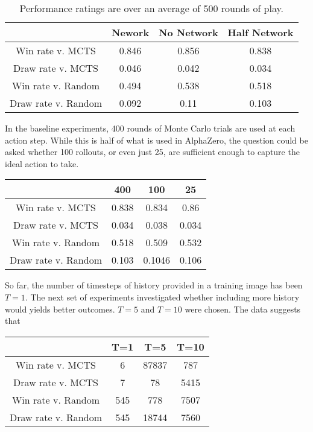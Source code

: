 \documentclass[twoside,11pt]{article}
\begin{document}
\begin{table}[ht]
\caption{Performance ratings are over an average of 500 rounds of play.}
\begin{center}
    \begin{tabular}{||c ||c c c||} 
    \hline
     & Nework & No Network & Half Network \\ [0.5ex] 
    \hline\hline
    Win rate v. MCTS & 0.846 & 0.856 & 0.838\\ 
    \hline
    Draw rate v. MCTS & 0.046 & 0.042 & 0.034 \\
    \hline
    Win rate v. Random & 0.494 & 0.538 & 0.518 \\
    \hline
    Draw rate v. Random & 0.092 & 0.11 & 0.103 \\
    \hline
   \end{tabular}
   \end{center}
\end{table}

In the baseline experiments, 400 rounds of Monte Carlo trials are used at each 
action step. While this is half of what is used in AlphaZero, the question could
be asked whether 100 rollouts, or even just 25, are sufficient enough to capture
the ideal action to take.

\begin{center}
    \begin{tabular}{||c c c c||} 
    \hline
     & 400 & 100 & 25 \\ [0.5ex] 
    \hline\hline
    Win rate v. MCTS & 0.838 & 0.834 & 0.86 \\ 
    \hline
    Draw rate v. MCTS & 0.034 & 0.038 & 0.034 \\
    \hline
    Win rate v. Random &  0.518 & 0.509 & 0.532 \\
    \hline
    Draw rate v. Random & 0.103 & 0.1046 & 0.106 \\
    \hline
   \end{tabular}
   \end{center}


So far, the number of timesteps of history provided in a training image has been $T=1$. 
The next set of experiments investigated whether including more history would yields
better outcomes. $T=5$ and $T=10$ were chosen. The data suggests that 


\begin{center}
    \begin{tabular}{||c c c c||} 
    \hline
     & T=1 & T=5 & T=10 \\ [0.5ex] 
    \hline\hline
    Win rate v. MCTS & 6 & 87837 & 787 \\ 
    \hline
    Draw rate v. MCTS & 7 & 78 & 5415 \\
    \hline
    Win rate v. Random & 545 & 778 & 7507 \\
    \hline
    Draw rate v. Random & 545 & 18744 & 7560 \\
    \hline
   \end{tabular}
   \end{center}
\end{document}
